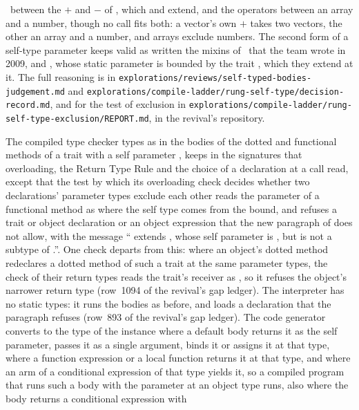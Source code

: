 \begin{description}
\library\ between the $+$ and $-$ of , which 
and  extend, and the operators between an array and a number, though
no call fits both: a vector's own $+$ takes two vectors, the other an array and
a number, and arrays exclude numbers.
The second form of a self-type parameter keeps valid as written the mixins of
\library\ that the team wrote in 2009,  and
, whose static parameter is bounded by the trait
, which they extend at it.
The full reasoning is in
\nolinkurl{explorations/reviews/self-typed-bodies-judgement.md} and
\nolinkurl{explorations/compile-ladder/rung-self-type/decision-record.md}, and for
the test of exclusion in
\nolinkurl{explorations/compile-ladder/rung-self-type-exclusion/REPORT.md}, in the
revival's repository.
\item[Effect] The compiled type checker types  as  in
the bodies of the dotted and functional methods of a trait with a self
parameter , keeps  in the signatures that overloading, the Return
Type Rule and the choice of a declaration at a call read, except that the test
by which its overloading check decides whether two declarations' parameter types
exclude each other reads the  parameter of a functional method as
 where the self type comes from the bound, and refuses a trait
or object declaration or an object expression that the new paragraph of
 does not allow, with the message
`` extends , whose self parameter is ,
but  is not a subtype of .''.
One check departs from this: where an object's dotted method redeclares a dotted
method of such a trait at the same parameter types, the check of their return
types reads the trait's receiver as , so it refuses the object's
narrower return type (row~1094 of the revival's gap ledger).
The interpreter has no static types: it runs the bodies as before, and loads a
declaration that the paragraph refuses (row~893 of the revival's gap ledger).
The code generator converts  to the type of the instance where a default
body returns it as the self parameter, passes it as a single argument, binds it or
assigns it at that type, where a function expression or a local function returns
it at that type, and where an arm of a conditional expression of that type yields
it, so a compiled program that runs such a body with the parameter at an object
type runs, also where the body returns a conditional expression with 

\end{description}
